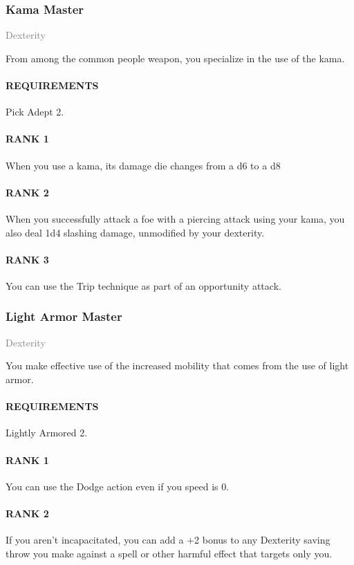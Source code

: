 \subsubsection{Kama Master} \label{feat::kamamaster}
\small{\textcolor{gray}{Dexterity}}

\normalsize
From among the common people weapon, you specialize in the use of the kama.
\paragraph{REQUIREMENTS} Pick Adept 2.
\paragraph{RANK 1} When you use a kama, its damage die changes from a d6 to a d8
\paragraph{RANK 2} When you successfully attack a foe with a piercing attack using your kama, you also deal 1d4 slashing damage, unmodified by your dexterity.
\paragraph{RANK 3} You can use the Trip technique as part of an opportunity attack.

\subsubsection{Light Armor Master} \label{feat::lightarmormaster}
\small{\textcolor{gray}{Dexterity}}

\normalsize
You make effective use of the increased mobility that comes from the use of light armor.
\paragraph{REQUIREMENTS} Lightly Armored 2.
\paragraph{RANK 1} You can use the Dodge action even if you speed is 0.
\paragraph{RANK 2} If you aren't incapacitated, you can add a +2 bonus to any Dexterity saving throw you make against a spell or other harmful effect that targets only you.

